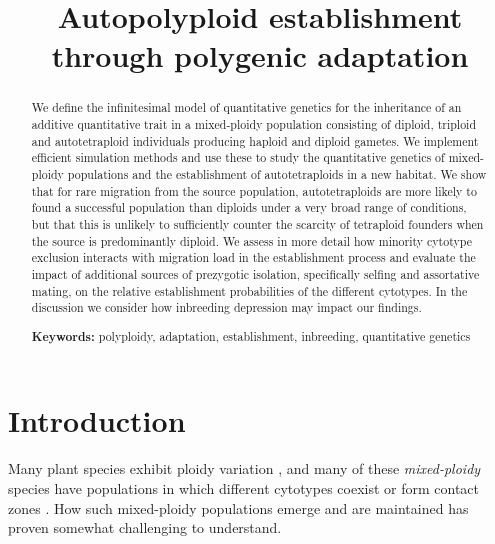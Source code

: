 \documentclass[12pt,a4paper]{article}
\begin{document}
\title{Autopolyploid establishment through polygenic adaptation}
\author{}
\date{\vspace{-5ex}}
\maketitle
\begin{abstract}
We define the infinitesimal model of quantitative genetics for the inheritance
    of an additive quantitative trait in a mixed-ploidy population consisting
    of diploid, triploid and autotetraploid individuals producing haploid and
    diploid gametes.
    We implement efficient simulation methods and use these to study the
    quantitative genetics of mixed-ploidy populations and the establishment of
    autotetraploids in a new habitat.
    We show that for rare migration from the source population, autotetraploids
    are more likely to found a successful population than diploids under a very
    broad range of conditions, but that this is unlikely to sufficiently
    counter the scarcity of tetraploid founders when the source is
    predominantly diploid.
    We assess in more detail how minority cytotype exclusion interacts with
    migration load in the establishment process and evaluate the impact of
    additional sources of prezygotic isolation, specifically selfing and
    assortative mating, on the relative establishment probabilities of the
    different cytotypes.
    In the discussion we consider how inbreeding depression may impact our
    findings.

    \textbf{Keywords:} polyploidy, adaptation, establishment, inbreeding,
    quantitative genetics 
\end{abstract}

\section*{Introduction}

Many plant species exhibit ploidy variation
\citep{levin2002,soltis2007,rice2015}, and many of these \textit{mixed-ploidy}
species have populations in which different cytotypes coexist or form contact
zones \citep{kolar2017}.
How such mixed-ploidy populations emerge and are maintained has proven somewhat
challenging to understand.
\end{document}
